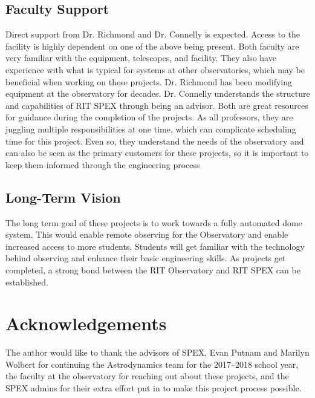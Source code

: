 \documentclass[conference]{IEEEtran} %
\begin{document}
\subsection{Faculty Support}
  Direct support from Dr. Richmond and Dr. Connelly is expected.
  Access to the facility is highly dependent on one of the above being present.
  Both faculty are very familiar with the equipment, telescopes, and facility.
  They also have experience with what is typical for systems at other observatories, which may be beneficial when working on these projects.
  Dr. Richmond has been modifying equipment at the observatory for decades.
  Dr. Connelly understands the structure and capabilities of RIT SPEX through being an advisor.
  Both are great resources for guidance during the completion of the projects.
  As all professors, they are juggling multiple responsibilities at one time, which can complicate scheduling time for this project.
  Even so, they understand the needs of the observatory and can also be seen as the primary customers for these projects, so it is important to keep them informed through the engineering process

\subsection{Long-Term Vision}
\label{sec:vision}
The long term goal of these projects is to work towards a fully automated dome system.
This would enable remote observing for the Observatory and enable increased access to more students.
Students will get familiar with the technology behind observing and enhance their basic engineering skills.
As projects get completed, a strong bond between the RIT Observatory and RIT SPEX can be established.

\section*{Acknowledgements}
The author would like to thank the advisors of SPEX, Evan Putnam and Marilyn Wolbert for continuing the Astrodynamics team for the 2017--2018 school year, the faculty at the observatory for reaching out about these projects, and the SPEX admins for their extra effort put in to make this project process possible.
\end{document}
